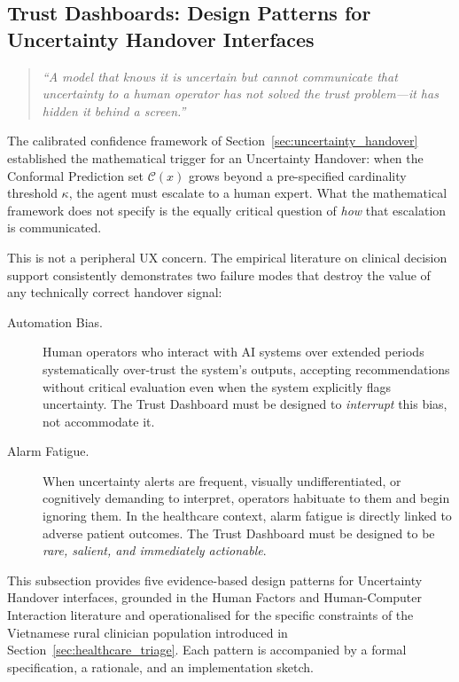 \subsection{Trust Dashboards: Design Patterns for Uncertainty
            Handover Interfaces}
\label{sec:trust-dashboards}

\begin{quote}
\textit{``A model that knows it is uncertain but cannot communicate
that uncertainty to a human operator has not solved the trust
problem---it has hidden it behind a screen.''}
\end{quote}

The calibrated confidence framework of
Section~\ref{sec:uncertainty_handover} established the
mathematical trigger for an Uncertainty Handover: when the
Conformal Prediction set $\mathcal{C}(x)$ grows beyond a
pre-specified cardinality threshold $\kappa$, the agent must
escalate to a human expert.
What the mathematical framework does not specify is the equally
critical question of \emph{how} that escalation is communicated.

This is not a peripheral UX concern.
The empirical literature on clinical decision support consistently
demonstrates two failure modes that destroy the value of any
technically correct handover signal:

\begin{description}
  \item[Automation Bias.]
    Human operators who interact with AI systems over extended
    periods systematically over-trust the system's outputs,
    accepting recommendations without critical evaluation even
    when the system explicitly flags uncertainty.
    The Trust Dashboard must be designed to \emph{interrupt}
    this bias, not accommodate it.

  \item[Alarm Fatigue.]
    When uncertainty alerts are frequent, visually undifferentiated,
    or cognitively demanding to interpret, operators habituate to
    them and begin ignoring them.
    In the healthcare context, alarm fatigue is directly linked
    to adverse patient outcomes.
    The Trust Dashboard must be designed to be \emph{rare,
    salient, and immediately actionable}.
\end{description}

This subsection provides five evidence-based design patterns for
Uncertainty Handover interfaces, grounded in the Human Factors
and Human-Computer Interaction literature and operationalised for
the specific constraints of the Vietnamese rural clinician
population introduced in
Section~\ref{sec:healthcare_triage}.
Each pattern is accompanied by a formal specification, a
rationale, and an implementation sketch.


